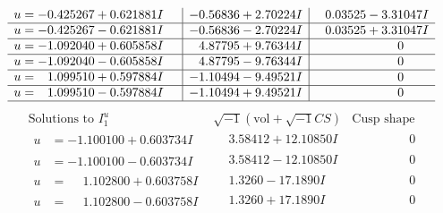 \documentclass[1p]{elsarticle_modified}
\theoremstyle{definition}
\newcommand{\I}{\sqrt{-1}}
\begin{document}
$$\begin{array}{c|c|c}
\begin{aligned}
u &= -0.425267 + 0.621881 I\end{aligned}
 & -0.56836 + 2.70224 I & \phantom{-}0.03525 - 3.31047 I \\ \hline\begin{aligned}
u &= -0.425267 - 0.621881 I\end{aligned}
 & -0.56836 - 2.70224 I & \phantom{-}0.03525 + 3.31047 I \\ \hline\begin{aligned}
u &= -1.092040 + 0.605858 I\end{aligned}
 & \phantom{-}4.87795 + 9.76344 I & \phantom{-0.000000 } 0 \\ \hline\begin{aligned}
u &= -1.092040 - 0.605858 I\end{aligned}
 & \phantom{-}4.87795 - 9.76344 I & \phantom{-0.000000 } 0 \\ \hline\begin{aligned}
u &= \phantom{-}1.099510 + 0.597884 I\end{aligned}
 & -1.10494 - 9.49521 I & \phantom{-0.000000 } 0 \\ \hline\begin{aligned}
u &= \phantom{-}1.099510 - 0.597884 I\end{aligned}
 & -1.10494 + 9.49521 I & \phantom{-0.000000 } 0\\
 \hline 
 \end{array}$$\newpage$$\begin{array}{c|c|c}  
\text{Solutions to }I^u_{1}& \I (\text{vol} + \sqrt{-1}CS) & \text{Cusp shape}\\
 \hline 
\begin{aligned}
u &= -1.100100 + 0.603734 I\end{aligned}
 & \phantom{-}3.58412 + 12.10850 I & \phantom{-0.000000 } 0 \\ \hline\begin{aligned}
u &= -1.100100 - 0.603734 I\end{aligned}
 & \phantom{-}3.58412 - 12.10850 I & \phantom{-0.000000 } 0 \\ \hline\begin{aligned}
u &= \phantom{-}1.102800 + 0.603758 I\end{aligned}
 & \phantom{-}1.3260 - 17.1890 I & \phantom{-0.000000 } 0 \\ \hline\begin{aligned}
u &= \phantom{-}1.102800 - 0.603758 I\end{aligned}
 & \phantom{-}1.3260 + 17.1890 I & \phantom{-0.000000 } 0 \\ \hline\begin{aligned}

\end{aligned}
\end{array}$$
\end{document}
